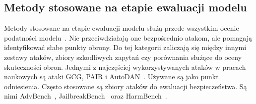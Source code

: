 \subsection{Metody stosowane na etapie ewaluacji modelu}
Metody stosowane na etapie ewaluacji modelu służą przede wszystkim ocenie podatności modelu~\cite{correia2026systematicliteraturereviewllm}. Nie przeciwdziałają one bezpośrednio atakom, ale pomagają identyfikować słabe punkty obrony. Do tej kategorii zaliczają się między innymi zestawy ataków, zbiory szkodliwych zapytań czy porównania służące do oceny skuteczności obron. Jednymi z najczęściej wykorzystywanych ataków w pracach naukowych są ataki GCG, PAIR i AutoDAN~\cite{correia2026systematicliteraturereviewllm}. Używane są jako punkt odniesienia. Często stosowane są zbiory ataków do ewaluacji bezpieczeństwa. Są nimi AdvBench~\cite{zou2023universaltransferableadversarialattacks}, JailbreakBench~\cite{chao2024jailbreakbenchopenrobustnessbenchmark} oraz HarmBench~\cite{mazeika2024harmbenchstandardizedevaluationframework}.